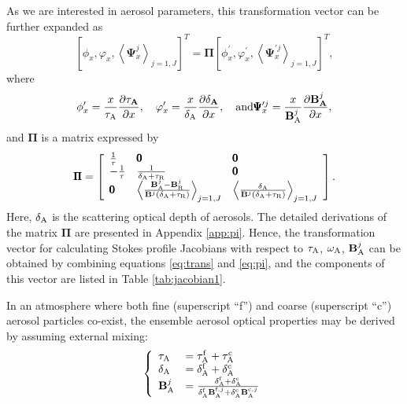 As we are interested in aerosol parameters, this transformation vector
can be further expanded as 
\begin{equation}
\left[ \phi_x, \varphi_x, \left< \pmb{\Psi}_x^j\right>_{j=1,J}\right]^T
=\pmb{\Pi} \left[ \phi_x^\prime, \varphi_x^\prime, \left<
\pmb{\Psi}_x^{\prime j}\right>_{j=1,J}\right]^T, \label{eq:trans}
\end{equation}
where
\begin{equation}
\phi_x^\prime = \frac{x}{\tau_\text{A}}\frac{\partial\tau_\mathbf{A}}{\partial x}, \quad 
\varphi_x^\prime = \frac{x}{\delta_\text{A}}\frac{\partial\delta_\mathbf{A}}{\partial x}, \quad  \mbox{and} 
\pmb{\Psi}_x^{\prime j} = \frac{x}{\mathbf{B}_\text{A}^j}\frac{\partial\mathbf{B}_\mathbf{A}^j}{\partial x},
\end{equation}
and $\pmb{\Pi}$ is a matrix expressed by
\begin{equation}
\pmb{\Pi} = \left[ 
            \begin{array}{lll}
            \frac{1}{\tau}  & \pmb{0} & \pmb{0} \\
            -\frac{1}{\tau} & \frac{1}{\delta_\text{A}+\tau_\text{R}} & \pmb{0} \\
            \pmb{0} & \left<
\frac{\mathbf{B}_\text{A}^j-\mathbf{B}_\text{R}^j}{\mathbf{B}^j(\delta_\text{A}+\tau_\text{R})}\right>_{j=1,J} & 
\left< \frac{\delta_\text{A}}{\mathbf{B}^j(\delta_\text{A}+\tau_\text{R})}\right>_{j=1,J}
            \end{array}
            \right]. \label{eq:pi}
\end{equation}
Here, $\delta_\text{A}$ is the scattering optical depth of aerosols. The detailed
derivations of the matrix $\pmb{\Pi}$ are presented in Appendix \ref{app:pi}. 
Hence, the transformation vector for calculating Stokes profile Jacobians 
with respect to $\tau_\text{A}$, $\omega_\text{A}$, $\mathbf{B}_\text{A}^j$ can be obtained by combining 
equations \eqref{eq:trans} and \eqref{eq:pi}, and the components of 
this vector are listed in Table \ref{tab:jacobian1}.

In an atmosphere where both fine (superscript “f”) and coarse
(superscript “c”) aerosol particles co-exist, the ensemble aerosol
optical properties may be derived by assuming external mixing:
\begin{equation}
\left\{  
\begin{array}{ll}
\tau_\text{A} &= \tau_\text{A}^\text{f} + \tau_\text{A}^\text{c} \\
\delta_\text{A} &= \delta_\text{A}^\text{f} + \delta_\text{A}^\text{c} \\
\mathbf{B}_\text{A}^j &= \frac{\delta_\text{A}^\text{f} + \delta_\text{A}^\text{c}}
           {\delta_\text{A}^\text{f}\mathbf{B}_\text{A}^{\text{f},j} + \delta_\text{A}^\text{c}\mathbf{B}_\text{A}^{\text{c},j} }
\end{array} 
\right.
\end{equation}


